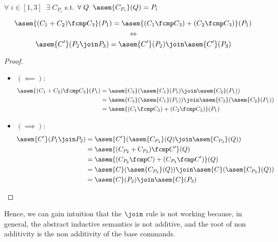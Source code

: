 \begin{theorem} $\;$\\
  $\forall \; i \in [1, 3] \;\; \exists \; C_{P_i}$ s.t. 
  $\forall \; Q \;\; \asem{C_{P_i}}(Q) = P_i$

  $$\asem{(C_1 + C_2) \fcmp C_3}(P_1) = \asem{(C_1 \fcmp C_3) + (C_2 \fcmp C_3)}(P_1)$$
  $$\iff$$
  $$\asem{C'}(P_2 \join P_3) = \asem{C'}(P_2) \join \asem{C'}(P_3)$$
\end{theorem}
\begin{proof} $\;$\\
  \begin{itemize}
    \item $(\impliedby)$:
      \begin{align*}
        \asem{(C_1 + C_2) \fcmp C_3}(P_1)
          &= \asem{C_3}(\asem{C_1}(P_1) \join \asem{C_2}(P_1)) \\
          &= \asem{C_3}(\asem{C_1}(P_1)) \join \asem{C_3}(\asem{C_2}(P_1)) \\
          &= \asem{(C_1 \fcmp C_3) + (C_2 \fcmp C_3)}(P_1)
      \end{align*}
    \item $(\implies)$:
      \begin{align*}
        \asem{C'}(P_1 \join P_2) 
          &= \asem{C'}(\asem{C_{P_2}}(Q) \join \asem{C_{P_3}}(Q)) \\
          &= \asem{(C_{P_2} + C_{P_3}) \fcmp C'}(Q) \\
          &= \asem{(C_{P_2} \fcmp C) + (C_{P_3} \fcmp C')}(Q) \\
          &= \asem{C}(\asem{C_{P_2}}(Q)) \join \asem{C}(\asem{C_{P_3}}(Q)) \\
          &= \asem{C}(P_2) \join \asem{C}(P_3)
      \end{align*}
  \end{itemize}
\end{proof}

Hence, we can gain intuition that the $\join$ rule is not working because, in
general, the abstract inductive semantics is not additive, and the root of non
additivity is the non additivity of the base commands.

